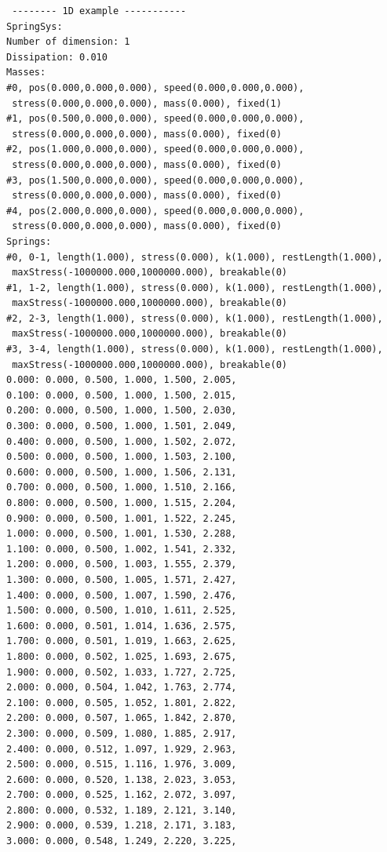 \documentclass[12pt, a4paper]{article}
\begin{document}
\begin{scriptsize}
\begin{ttfamily}
\begin{lstlisting}
 -------- 1D example -----------
SpringSys:
Number of dimension: 1
Dissipation: 0.010
Masses:
#0, pos(0.000,0.000,0.000), speed(0.000,0.000,0.000),
 stress(0.000,0.000,0.000), mass(0.000), fixed(1)
#1, pos(0.500,0.000,0.000), speed(0.000,0.000,0.000),
 stress(0.000,0.000,0.000), mass(0.000), fixed(0)
#2, pos(1.000,0.000,0.000), speed(0.000,0.000,0.000),
 stress(0.000,0.000,0.000), mass(0.000), fixed(0)
#3, pos(1.500,0.000,0.000), speed(0.000,0.000,0.000),
 stress(0.000,0.000,0.000), mass(0.000), fixed(0)
#4, pos(2.000,0.000,0.000), speed(0.000,0.000,0.000),
 stress(0.000,0.000,0.000), mass(0.000), fixed(0)
Springs:
#0, 0-1, length(1.000), stress(0.000), k(1.000), restLength(1.000),
 maxStress(-1000000.000,1000000.000), breakable(0)
#1, 1-2, length(1.000), stress(0.000), k(1.000), restLength(1.000),
 maxStress(-1000000.000,1000000.000), breakable(0)
#2, 2-3, length(1.000), stress(0.000), k(1.000), restLength(1.000),
 maxStress(-1000000.000,1000000.000), breakable(0)
#3, 3-4, length(1.000), stress(0.000), k(1.000), restLength(1.000),
 maxStress(-1000000.000,1000000.000), breakable(0)
0.000: 0.000, 0.500, 1.000, 1.500, 2.005, 
0.100: 0.000, 0.500, 1.000, 1.500, 2.015, 
0.200: 0.000, 0.500, 1.000, 1.500, 2.030, 
0.300: 0.000, 0.500, 1.000, 1.501, 2.049, 
0.400: 0.000, 0.500, 1.000, 1.502, 2.072, 
0.500: 0.000, 0.500, 1.000, 1.503, 2.100, 
0.600: 0.000, 0.500, 1.000, 1.506, 2.131, 
0.700: 0.000, 0.500, 1.000, 1.510, 2.166, 
0.800: 0.000, 0.500, 1.000, 1.515, 2.204, 
0.900: 0.000, 0.500, 1.001, 1.522, 2.245, 
1.000: 0.000, 0.500, 1.001, 1.530, 2.288, 
1.100: 0.000, 0.500, 1.002, 1.541, 2.332, 
1.200: 0.000, 0.500, 1.003, 1.555, 2.379, 
1.300: 0.000, 0.500, 1.005, 1.571, 2.427, 
1.400: 0.000, 0.500, 1.007, 1.590, 2.476, 
1.500: 0.000, 0.500, 1.010, 1.611, 2.525, 
1.600: 0.000, 0.501, 1.014, 1.636, 2.575, 
1.700: 0.000, 0.501, 1.019, 1.663, 2.625, 
1.800: 0.000, 0.502, 1.025, 1.693, 2.675, 
1.900: 0.000, 0.502, 1.033, 1.727, 2.725, 
2.000: 0.000, 0.504, 1.042, 1.763, 2.774, 
2.100: 0.000, 0.505, 1.052, 1.801, 2.822, 
2.200: 0.000, 0.507, 1.065, 1.842, 2.870, 
2.300: 0.000, 0.509, 1.080, 1.885, 2.917, 
2.400: 0.000, 0.512, 1.097, 1.929, 2.963, 
2.500: 0.000, 0.515, 1.116, 1.976, 3.009, 
2.600: 0.000, 0.520, 1.138, 2.023, 3.053, 
2.700: 0.000, 0.525, 1.162, 2.072, 3.097, 
2.800: 0.000, 0.532, 1.189, 2.121, 3.140, 
2.900: 0.000, 0.539, 1.218, 2.171, 3.183, 
3.000: 0.000, 0.548, 1.249, 2.220, 3.225, 

\end{lstlisting}
\end{ttfamily}
\end{scriptsize}
\end{document}
